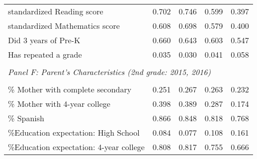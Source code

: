 {\begin{tabular}{lcccc}
standardized Reading score&       0.702&       0.746&       0.599&       0.397\\
standardized Mathematics score&       0.608&       0.698&       0.579&       0.400\\
Did 3 years of Pre-K&       0.660&       0.643&       0.603&       0.547\\
Has repeated a grade&       0.035&       0.030&       0.041&       0.058\\
&  &  &   \\
\multicolumn{4}{l}{\textit{Panel F: Parent's Characteristics (2nd grade: 2015, 2016)}} \\
            &            &            &            &            \\
\% Mother with complete secondary&       0.251&       0.267&       0.263&       0.232\\
\% Mother with 4-year college&       0.398&       0.389&       0.287&       0.174\\
\% Spanish  &       0.866&       0.848&       0.818&       0.768\\
\%Education expectation: High School&       0.084&       0.077&       0.108&       0.161\\
\%Education expectation: 4-year college&       0.808&       0.817&       0.755&       0.666\\

\bottomrule
\end{tabular}
}
